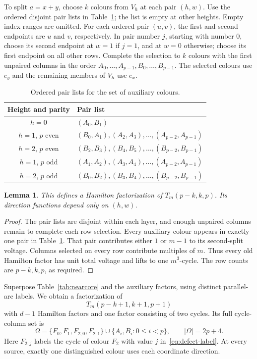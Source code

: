 \documentclass[11pt,reqno]{amsart}
\numberwithin{equation}{section}
\newtheorem{lemma}[theorem]{Lemma}
\theoremstyle{definition}
\theoremstyle{remark}
\newcommand{\cO}{\Omega}
\begin{document}
To split $a=x+y$, choose $k$ colours from $V_h$ at each pair $(h,w)$. Use the
ordered disjoint pair lists in Table~\ref{tab:shellpairs}; the list is empty at
other heights. Empty index ranges are omitted. For each ordered pair $(u,v)$, the first and second endpoints are
$u$ and $v$, respectively. In pair number $j$,
starting with number $0$, choose its second endpoint at $w=1$ if $j=1$, and at
$w=0$ otherwise; choose its first endpoint on all other rows. Complete the selection to $k$ colours with the first unpaired columns in
the order
$A_0,\ldots,A_{p-1},B_0,\ldots,B_{p-1}$. The selected colours use $e_y$ and the
remaining members of $V_h$ use $e_x$.

\begin{table}[htbp]
\centering
\caption{Ordered pair lists for the set of auxiliary colours.}\label{tab:shellpairs}
\begin{tabular}{cl}
\toprule
Height and parity & Pair list\\
\midrule
$h=0$ & $(A_0,B_1)$\\
$h=1$, $p$ even & $(B_0,A_1),(A_2,A_3),\ldots,(A_{p-2},A_{p-1})$\\
$h=2$, $p$ even & $(B_2,B_3),(B_4,B_5),\ldots,(B_{p-2},B_{p-1})$\\
$h=1$, $p$ odd & $(A_1,A_2),(A_3,A_4),\ldots,(A_{p-2},A_{p-1})$\\
$h=2$, $p$ odd & $(B_0,B_2),(B_3,B_4),\ldots,(B_{p-2},B_{p-1})$\\
\bottomrule
\end{tabular}
\end{table}

\begin{lemma}\label{lem:shell}
This defines a Hamilton factorization of $T_m(p-k,k,p)$. Its direction functions
depend only on $(h,w)$.
\end{lemma}
\begin{proof}
The pair lists are disjoint within each layer, and enough unpaired columns
remain to complete each row selection. Every auxiliary colour appears in exactly
one pair in Table~\ref{tab:shellpairs}. That pair contributes either $1$ or $m-1$
to its second-split voltage. Columns selected on every row contribute
multiples of $m$. Thus every
old Hamilton factor has unit total voltage and lifts to one $m^3$-cycle. The row counts
are $p-k,k,p$, as required.
\end{proof}

Superpose Table~\ref{tab:nearcore} and the auxiliary factors, using distinct
parallel-arc labels. We obtain a factorization of
\begin{equation}\label{eq:seed-widths}
 T_m(p-k+1,k+1,p+1)
\end{equation}
with $d-1$ Hamilton factors and one factor consisting of two cycles. Its full cycle-column
set is
\begin{equation}\label{eq:seed-columns}
 \cO=\{F_0,F_1,F_{2,0},F_{2,1}\}
       \cup\{A_i,B_i:0\le i<p\},\qquad |\cO|=2p+4.
\end{equation}
Here $F_{2,j}$ labels the cycle of colour $F_2$ with value $j$
in~\eqref{eq:defect-label}. At every source, exactly one distinguished
colour uses each coordinate direction.
\end{document}
